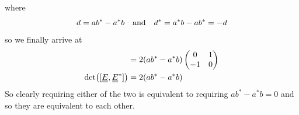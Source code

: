 \documentclass[12pt]{article}
\newcommand{\duf}[2]{\stackunder[0.5pt]{\stackunder[0.8pt]{\stackunder[1pt]{\ensuremath{#1}}{\rule{\widthof{\ensuremath{#2}}*\real{0.9}}{.1ex}}}{\rule{\widthof{\ensuremath{#2}}*\real{0.9}}{.1ex}}}{}}
\newcommand{\du}[1]{\duf{#1}{#1}}
\newcommand{\EE}{\ensuremath{\du{E}}}
\begin{document}
\begin{appendices}
        where
        \begin{equation}
            d = ab^* - a^*b \qq{and} d^* = a^*b - ab^* = -d
        \end{equation}
        so we finally arrive at
        \begin{align}
            [\EE,\EE^*] &= 2 (ab^* - a^*b) \begin{pmatrix}
                0 & 1 \\
                -1 & 0 \\
            \end{pmatrix} \\
            \det([\EE,\EE^*]) &= 2 (ab^* - a^*b)
        \end{align}
        So clearly requiring either of the two is equivalent to requiring $ab^*-a^*b = 0$ and so they are equivalent to each other.
\end{appendices}
\end{document}
